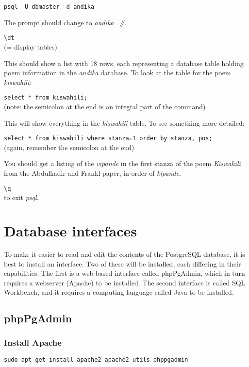 \documentclass[a4paper,10pt]{article}
\begin{document}
\verb|psql -U dbmaster -d andika|

The prompt should change to \textit{andika=\#}. 

\verb|\dt|\\
(= display tables)

This should show a list with 18 rows, each representing a database table holding poem information in the \textit{andika} database.  To look at the table for the poem \textit{kiswahili}:

\verb|select * from kiswahili;|\\
(note: the semicolon at the end is an integral part of the command)

This will show everything in the \textit{kiswahili} table. To see something more detailed:

\verb|select * from kiswahili where stanza=1 order by stanza, pos;|\\
(again, remember the semicolon at the end)

You should get a listing of the \textit{vipande} in the first stanza of the poem \textit{Kiswahili} from the Abdulkadir and Frankl paper, in order of \textit{kipande}.

\verb|\q|\\
to exit \textit{psql}.


\section{Database interfaces}

To make it easier to read and edit the contents of the PostgreSQL database, it is best to install an interface.  Two of these will be installed, each differing in their capabilities.  The first is a web-based interface called phpPgAdmin, which in turn requires a webserver (Apache) to be installed.  The second interface is called SQL Workbench, and it requires a computing language called Java to be installed.

\subsection{phpPgAdmin}

\subsubsection{Install Apache}
\label{ss:apache}

\verb|sudo apt-get install apache2 apache2-utils phppgadmin|
\end{document}
